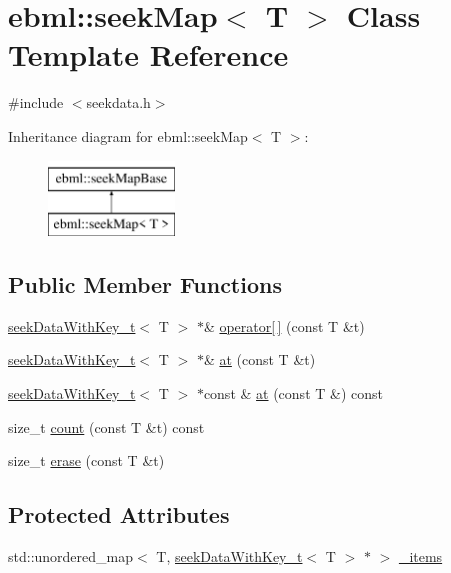 \hypertarget{classebml_1_1seekMap}{}\section{ebml\+:\+:seek\+Map$<$ T $>$ Class Template Reference}
\label{classebml_1_1seekMap}


{\ttfamily \#include $<$seekdata.\+h$>$}

Inheritance diagram for ebml\+:\+:seek\+Map$<$ T $>$\+:\begin{figure}[H]
\begin{center}
\leavevmode
\includegraphics[height=2.000000cm]{classebml_1_1seekMap}
\end{center}
\end{figure}
\subsection*{Public Member Functions}
\begin{DoxyCompactItemize}
\item 
\mbox{\hyperlink{classebml_1_1seekDataWithKey__t}{seek\+Data\+With\+Key\+\_\+t}}$<$ T $>$ $\ast$\& \mbox{\hyperlink{classebml_1_1seekMap_ada2dfac4d3ed8f6046703a3385afc3d5}{operator\mbox{[}$\,$\mbox{]}}} (const T \&t)
\item 
\mbox{\hyperlink{classebml_1_1seekDataWithKey__t}{seek\+Data\+With\+Key\+\_\+t}}$<$ T $>$ $\ast$\& \mbox{\hyperlink{classebml_1_1seekMap_af99606cf546d3e99e6445a0baf5a6cad}{at}} (const T \&t)
\item 
\mbox{\hyperlink{classebml_1_1seekDataWithKey__t}{seek\+Data\+With\+Key\+\_\+t}}$<$ T $>$ $\ast$const  \& \mbox{\hyperlink{classebml_1_1seekMap_a4ec29d60a1d8b8edd825499dc87498b1}{at}} (const T \&) const
\item 
size\+\_\+t \mbox{\hyperlink{classebml_1_1seekMap_aa23bfd6f97470e3961143475031e84bd}{count}} (const T \&t) const
\item 
size\+\_\+t \mbox{\hyperlink{classebml_1_1seekMap_aba83cd8b8a60bd460bfe78acf1d04616}{erase}} (const T \&t)
\end{DoxyCompactItemize}
\subsection*{Protected Attributes}
\begin{DoxyCompactItemize}
\item 
std\+::unordered\+\_\+map$<$ T, \mbox{\hyperlink{classebml_1_1seekDataWithKey__t}{seek\+Data\+With\+Key\+\_\+t}}$<$ T $>$ $\ast$ $>$ \mbox{\hyperlink{classebml_1_1seekMap_aa2314daf708d3b18ab5cf5d64afb3253}{\+\_\+items}}
\end{DoxyCompactItemize}


